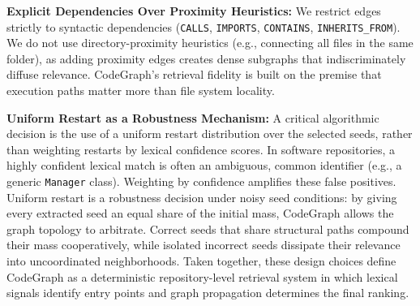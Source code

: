 \textbf{Explicit Dependencies Over Proximity Heuristics:} We restrict edges strictly to syntactic dependencies (\texttt{CALLS}, \texttt{IMPORTS}, \texttt{CONTAINS}, \texttt{INHERITS\_FROM}). We do not use directory-proximity heuristics (e.g., connecting all files in the same folder), as adding proximity edges creates dense subgraphs that indiscriminately diffuse relevance. CodeGraph's retrieval fidelity is built on the premise that execution paths matter more than file system locality.

\textbf{Uniform Restart as a Robustness Mechanism:} A critical algorithmic decision is the use of a uniform restart distribution over the selected seeds, rather than weighting restarts by lexical confidence scores. In software repositories, a highly confident lexical match is often an ambiguous, common identifier (e.g., a generic \texttt{Manager} class). Weighting by confidence amplifies these false positives. Uniform restart is a robustness decision under noisy seed conditions: by giving every extracted seed an equal share of the initial mass, CodeGraph allows the graph topology to arbitrate. Correct seeds that share structural paths compound their mass cooperatively, while isolated incorrect seeds dissipate their relevance into uncoordinated neighborhoods. Taken together, these design choices define CodeGraph as a deterministic repository-level retrieval system in which lexical signals identify entry points and graph propagation determines the final ranking.
